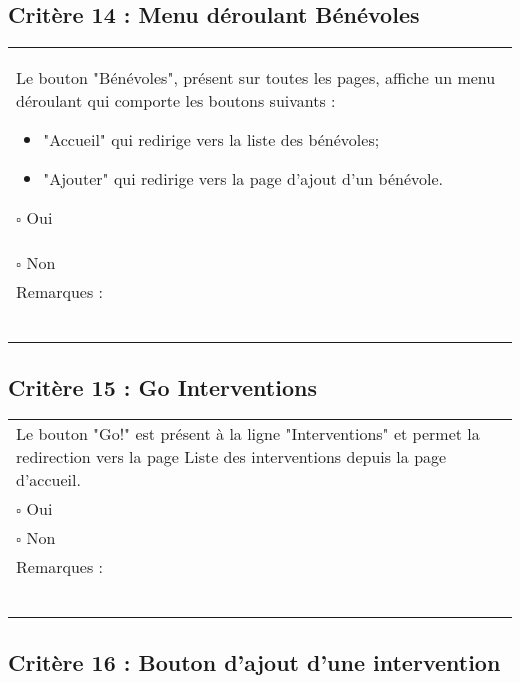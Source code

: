   		
  			\subsection*{Critère 14 : Menu déroulant Bénévoles}
	
	\begin{center}
    	 		\begin{tabular}[h]{|p{}|}
			\hline
				Le bouton "Bénévoles", présent sur toutes les pages, affiche un menu déroulant qui comporte les boutons suivants : 
				\begin{itemize}
					\item "Accueil" qui redirige vers la liste des bénévoles;
					\item "Ajouter" qui redirige vers la page d'ajout d'un bénévole.
				\end{itemize}
				$\square$ Oui  \\ $\square$ Non \\\hline Remarques : \\ ~\\
			 \\\hline
     		\end{tabular}
  		\end{center}
  		
  		
  			
  		
  		\subsection*{Critère 15 : Go Interventions}
	
	\begin{center}
    	 		\begin{tabular}[h]{|p{}|}
			\hline
				Le bouton "Go!" est présent à la ligne "Interventions" et permet la redirection vers la page Liste des interventions depuis la page d'accueil. \\
				$\square$ Oui  \\ $\square$ Non \\\hline Remarques : \\ ~\\
			 \\\hline
     		\end{tabular}
  		\end{center}	
  		
  		
  	\subsection*{Critère 16 : Bouton d'ajout d'une intervention}
	
